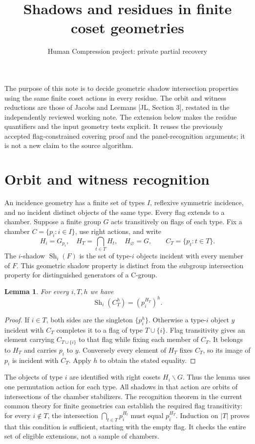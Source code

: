 \documentclass[11pt]{article}
\title{Shadows and residues in finite coset geometries}
\author{Human Compression project: private partial recovery}
\date{}
\newtheorem{lemma}[theorem]{Lemma}
\newcommand{\Sh}{\operatorname{Sh}}
\begin{document}
\maketitle
\noindent The purpose of this note is to decide geometric shadow intersection
properties using the same finite coset actions in every residue. The orbit
and witness reductions are those of Jacobs and Leemans [JL, Section 3],
restated in the independently reviewed working note. The extension below
makes the residue quantifiers and the input geometry tests explicit. It
reuses the previously accepted flag-constrained covering proof and the
panel-recognition arguments; it is not a new claim to the source algorithm.
\section{Orbit and witness recognition}
An incidence geometry has a finite set of types $I$, reflexive symmetric
incidence, and no incident distinct objects of the same type. Every flag
extends to a chamber. Suppose a finite group $G$ acts transitively on flags
of each type. Fix a chamber $C=\{p_i:i\in I\}$, use right actions, and write
\[
 H_i=G_{p_i},\quad H_T=\bigcap_{t\in T}H_t,\quad H_\varnothing=G,
 \qquad C_T=\{p_t:t\in T\}.
\]
The $i$-shadow $\Sh_i(F)$ is the set of type-$i$ objects incident with every
member of $F$. This geometric shadow property is distinct from the
subgroup intersection property for distinguished generators of a C-group.

\begin{lemma}\label{orbit}
For every $i,T,h$ we have
\[
             \Sh_i(C_T^h)=(p_i^{H_T})^h.
\]
\end{lemma}
\begin{proof}
If $i\in T$, both sides are the singleton $\{p_i^h\}$.
Otherwise a type-$i$ object $y$ incident with $C_T$ completes it to a flag
of type $T\cup\{i\}$. Flag transitivity gives an element carrying
$C_{T\cup\{i\}}$ to that flag while fixing each member of $C_T$.
It belongs to $H_T$ and carries $p_i$ to $y$. Conversely every element of
$H_T$ fixes $C_T$, so its image of $p_i$ is incident with $C_T$.
Apply $h$ to obtain the stated equality.
\end{proof}

The objects of type $i$ are identified with right cosets $H_i\backslash G$.
Thus the lemma uses one permutation action for each type. All shadows in
that action are orbits of intersections of the chamber stabilizers.
The recognition theorem in the current common theory for finite geometries
can establish the required flag transitivity: for every $i\notin T$, the
intersection $\bigcap_{t\in T}p_i^{H_t}$ must equal $p_i^{H_T}$.
Induction on $|T|$ proves that this condition is sufficient, starting with
the empty flag. It checks the entire set of eligible extensions, not a
sample of chambers.
\end{document}
